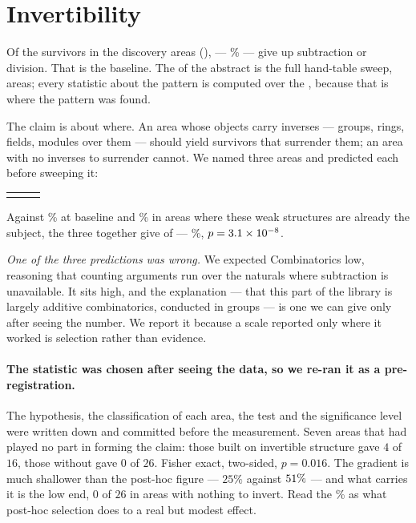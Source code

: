 \documentclass[11pt]{article}
\begin{document}
\section{Invertibility}\label{sec:gradient}

Of the \survivors{} survivors in the \areasSweptWord{} discovery areas
(\areaNames{}), \lostInvertibility{} --- \baseLostPercent{}\% --- give up
subtraction or division. That is the baseline. The \allSurvivors{} of the
abstract is the full hand-table sweep, \allAreasWord{} areas; every statistic
about the pattern is computed over the \survivors{}, because that is where the
pattern was found.

The claim is about where. An area whose objects carry inverses --- groups,
rings, fields, modules over them --- should yield survivors that surrender them;
an area with no inverses to surrender cannot. We named three areas and predicted
each before sweeping it:

\begin{center}
\begin{tabular}{lrr}
\gradientRows{}
\end{tabular}
\end{center}

Against \baseLostPercent{}\% at baseline and \predictedLostPercent{}\% in areas
where these weak structures are already the subject, the three together give
\gradientLost{} of \gradientTotal{} --- \gradientPercent{}\%,
$p = 3.1\times 10^{-8}{}$.

\emph{One of the three predictions was wrong.} We expected Combinatorics low,
reasoning that counting arguments run over the naturals where subtraction is
unavailable. It sits high, and the explanation --- that this part of the library
is largely additive combinatorics, conducted in groups --- is one we can give
only after seeing the number. We report it because a scale reported only where
it worked is selection rather than evidence.

\paragraph{The statistic was chosen after seeing the data, so we re-ran it as a
pre-registration.} The hypothesis, the classification of each area, the test and
the significance level were written down and committed before the measurement.
Seven areas that had played no part in forming the claim: those built on
invertible structure gave $4$ of $16$, those without gave $0$ of $26$. Fisher
exact, two-sided, $p = 0.016$. The gradient is much shallower than the post-hoc
figure --- $25\%$ against $51{}\%$ --- and what carries it is the
low end, $0$ of $26$ in areas with nothing to invert. Read the
\gradientPercent{}\% as what post-hoc selection does to a real but modest effect.
\end{document}
